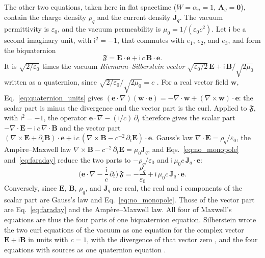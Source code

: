 \documentclass[aps,prd,onecolumn,tightenlines,nofootinbib,notitlepage,11pt,floatfix]{revtex4-2}
\theoremstyle{indentedtheorem}
\begin{document}
The other two equations, taken here in flat spacetime ($W=\alpha_n=1$, $\mathbf{A}_g=\mathbf{0}$), contain the charge density $\rho_q$ and the current density $\mathbf{J}_q$. The vacuum permittivity is $\varepsilon_0$, and the vacuum permeability is $\mu_0=1/(\varepsilon_0c^2)$. Let $\mathsf{i}$ be a second imaginary unit, with $\mathsf{i}^2=-1$, that commutes with $e_1$, $e_2$, and $e_3$, and form the biquaternion
\begin{equation}
    \mathfrak{F} = \mathbf{E}\cdot\mathbf{e} + \mathsf{i}\,c\,\mathbf{B}\cdot\mathbf{e} .
    \label{eq:rs_biquaternion}
\end{equation}
It is $\sqrt{2/\varepsilon_0}$ times the vacuum \emph{Riemann--Silberstein vector} $\sqrt{\varepsilon_0/2}\,\mathbf{E}+\mathsf{i}\,\mathbf{B}/\sqrt{2\mu_0}$ written as a quaternion, since $\sqrt{2/\varepsilon_0}/\sqrt{2\mu_0}=c$ \citep{BialynickiBirula1996Photon}. For a real vector field $\mathbf{w}$, Eq.~\eqref{eq:quaternion_units} gives $(\mathbf{e}\cdot\nabla)(\mathbf{w}\cdot\mathbf{e})=-\nabla\cdot\mathbf{w}+(\nabla\times\mathbf{w})\cdot\mathbf{e}$: the scalar part is minus the divergence and the vector part is the curl. Applied to $\mathfrak{F}$, with $\mathsf{i}^2=-1$, the operator $\mathbf{e}\cdot\nabla-(\mathsf{i}/c)\,\partial_t$ therefore gives the scalar part $-\nabla\cdot\mathbf{E}-\mathsf{i}\,c\,\nabla\cdot\mathbf{B}$ and the vector part $(\nabla\times\mathbf{E}+\partial_t\mathbf{B})\cdot\mathbf{e}+\mathsf{i}\,c\,(\nabla\times\mathbf{B}-c^{-2}\,\partial_t\mathbf{E})\cdot\mathbf{e}$. Gauss's law $\nabla\cdot\mathbf{E}=\rho_q/\varepsilon_0$, the Amp\`ere--Maxwell law $\nabla\times\mathbf{B}-c^{-2}\,\partial_t\mathbf{E}=\mu_0\mathbf{J}_q$, and Eqs.~\eqref{eq:no_monopole} and~\eqref{eq:faraday} reduce the two parts to $-\rho_q/\varepsilon_0$ and $\mathsf{i}\,\mu_0c\,\mathbf{J}_q\cdot\mathbf{e}$:
\begin{equation}
    \Big(\mathbf{e}\cdot\nabla-\frac{\mathsf{i}}{c}\,\partial_t\Big)\,\mathfrak{F} = -\frac{\rho_q}{\varepsilon_0} + \mathsf{i}\,\mu_0c\,\mathbf{J}_q\cdot\mathbf{e} .
    \label{eq:maxwell_biquaternion}
\end{equation}
Conversely, since $\mathbf{E}$, $\mathbf{B}$, $\rho_q$, and $\mathbf{J}_q$ are real, the real and $\mathsf{i}$ components of the scalar part are Gauss's law and Eq.~\eqref{eq:no_monopole}. Those of the vector part are Eq.~\eqref{eq:faraday} and the Amp\`ere--Maxwell law. All four of Maxwell's equations are thus the four parts of one biquaternion equation. Silberstein wrote the two curl equations of the vacuum as one equation for the complex vector $\mathbf{E}+\mathsf{i}\mathbf{B}$ in units with $c=1$, with the divergence of that vector zero \citep{Silberstein1907Elektromagnetische}, and the four equations with sources as one quaternion equation \citep{Silberstein1912Quaternionic}.
\end{document}
